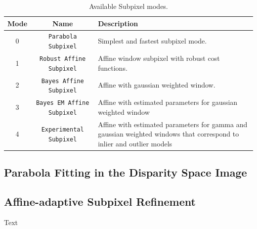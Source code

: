 \begin{table}[htb]\begin{centering}
\begin{tabular}{|c|c|p{3.5 in}|} \hline
Mode & Name & Description \\ \hline \hline
0 & \verb#Parabola Subpixel# & Simplest and fastest subpixel mode. \\ \hline
1 & \verb#Robust Affine Subpixel# & Affine window subpixel with robust cost functions. \\ \hline
2 & \verb#Bayes Affine Subpixel# & Affine with gaussian weighted window. \\ \hline
3 & \verb#Bayes EM Affine Subpixel# & Affine with estimated parameters for gaussian weighted window\\ \hline
4 & \verb#Experimental Subpixel# & Affine with estimated parameters for gamma and gaussian weighted windows that correspond to inlier and outlier models\\ \hline
\end{tabular}
\caption{Available Subpixel modes.}
\label{tbl:subpixel-modes}
\end{centering}\end{table}

\subsection{Parabola Fitting in the Disparity Space Image}
\label{sec:parabola_subpixel}

\subsection{Affine-adaptive Subpixel Refinement}
\label{sec:affine_subpixel}

Text

